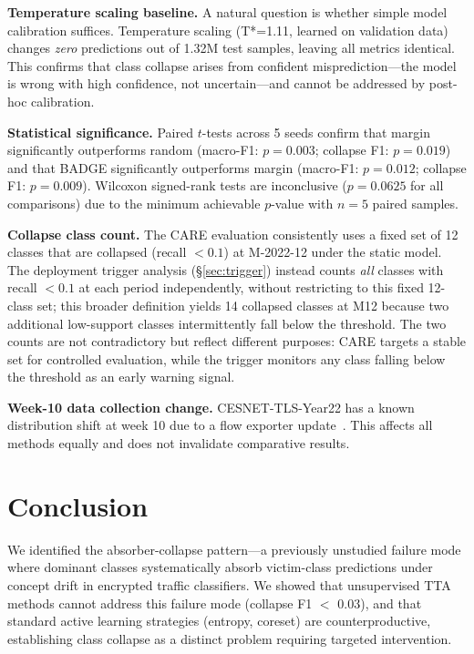 \documentclass[journal]{IEEEtran}
\begin{document}
\textbf{Temperature scaling baseline.}
A natural question is whether simple model calibration suffices. Temperature scaling (T*=1.11, learned on validation data) changes \textit{zero} predictions out of 1.32M test samples, leaving all metrics identical.
This confirms that class collapse arises from confident misprediction---the model is wrong with high confidence, not uncertain---and cannot be addressed by post-hoc calibration.

\textbf{Statistical significance.}
Paired $t$-tests across 5 seeds confirm that margin significantly outperforms random (macro-F1: $p=0.003$; collapse F1: $p=0.019$) and that BADGE significantly outperforms margin (macro-F1: $p=0.012$; collapse F1: $p=0.009$).
Wilcoxon signed-rank tests are inconclusive ($p=0.0625$ for all comparisons) due to the minimum achievable $p$-value with $n=5$ paired samples.

\textbf{Collapse class count.}
The CARE evaluation consistently uses a fixed set of 12 classes that are collapsed (recall ${<}0.1$) at M-2022-12 under the static model.
The deployment trigger analysis (\S\ref{sec:trigger}) instead counts \emph{all} classes with recall ${<}0.1$ at each period independently, without restricting to this fixed 12-class set; this broader definition yields 14 collapsed classes at M12 because two additional low-support classes intermittently fall below the threshold.
The two counts are not contradictory but reflect different purposes: CARE targets a stable set for controlled evaluation, while the trigger monitors any class falling below the threshold as an early warning signal.

\textbf{Week-10 data collection change.}
CESNET-TLS-Year22 has a known distribution shift at week 10 due to a flow exporter update~\cite{hynek2024cesnet}.
This affects all methods equally and does not invalidate comparative results.


\section{Conclusion}
\label{sec:conclusion}

We identified the absorber-collapse pattern---a previously unstudied failure mode where dominant classes systematically absorb victim-class predictions under concept drift in encrypted traffic classifiers.
We showed that unsupervised TTA methods cannot address this failure mode (collapse F1 $<$ 0.03), and that standard active learning strategies (entropy, coreset) are counterproductive, establishing class collapse as a distinct problem requiring targeted intervention.
\end{document}

